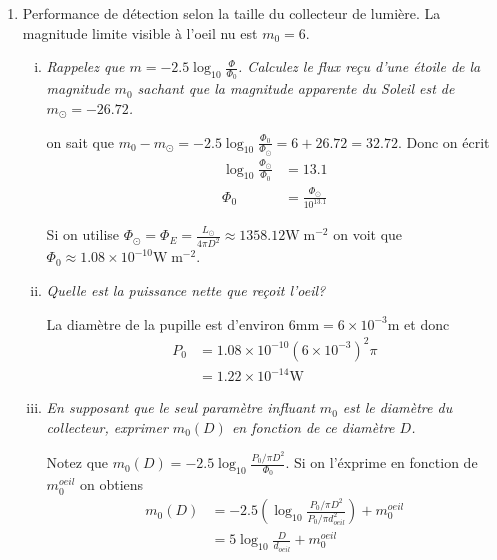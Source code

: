 \documentclass[10pt]{report}
\newcommand{\scinot}[2]{#1\times 10^{#2}}
\begin{document}
\begin{enumerate}[1)]
\begin{enumerate}[i)]
                Maintenant en assumant que la luminosit\'e de Sirius et la m\^eme que le Soleil, on peut mettre \'egal les deux expressions
                \begin{align}
                    \sigma T_{\odot}^4 \frac{R_{\odot}^2}{D_S^2}&= \pi R_{\odot}^2 \sigma T_{\odot}^4\frac{R_J^2}{ D_J^2}\frac{R_E^2}{4D_{EJ}^2}
                \end{align}

                Je n'ai pas fini cette \'exercise mais la r\'eponse est $83190 \mathrm{UA}$.
        \end{enumerate}
    \item Performance de d\'etection selon la taille du collecteur de lumi\`ere. La magnitude limite visible \`a l'oeil nu est $m_0 = 6$.
        \begin{enumerate}[i)]
            \item \emph{Rappelez que $m = -2.5 \log_{10} \frac{\Phi}{\Phi_0}$. Calculez le flux re\c{c}u d'une \'etoile de la magnitude $m_0$ sachant que la magnitude apparente du Soleil est de $m_{\odot} = -26.72$.}

                on sait que $m_0 - m_{\odot} = -2.5\log_{10}\frac{\Phi_0}{\Phi_{\odot}} = 6 + 26.72 = 32.72$. Donc on \'ecrit
                \begin{align}
                    \log_{10}\frac{\Phi_{\odot}}{\Phi_0} &= 13.1\\
                    \Phi_0 &= \frac{\Phi_{\odot}}{10^{13.1}}
                \end{align}
                
                Si on utilise $\Phi_{\odot} = \Phi_E = \frac{L_{\odot}}{4\pi D^2} \approx 1358.12 \mathrm{W\; m^{-2}}$ on voit que $\Phi_0 \approx \scinot{1.08}{-10}\mathrm{W\;m^{-2}}$.
            \item \emph{Quelle est la puissance nette que re\c{c}oit l'oeil?}

                La diam\`etre de la pupille est d'environ $6\mathrm{mm} = \scinot{6}{-3}\mathrm{m}$ et donc
                \begin{align}
                    P_0 &= \scinot{1.08}{-10} \left( \scinot{6}{-3} \right)^2 \pi\\
                    &= \scinot{1.22}{-14}\mathrm{W}
                \end{align}
            \item \emph{En supposant que le seul param\`etre influant $m_0$ est le diam\`etre du collecteur, exprimer $m_0(D)$ en fonction de ce diam\`etre $D$.}

                Notez que $m_0(D) = -2.5\log_{10}\frac{P_0/\pi D^2}{\Phi_0}$. Si on l'\'exprime en fonction de $m_0^{oeil}$ on obtiens
                \begin{align}
                    m_0(D) &= -2.5\left( \log_{10}\frac{P_0/\pi D^2}{P_0/\pi d_{oeil}^2}\right)  + m_0^{oeil}\\
                    &= 5\log_{10}\frac{D}{d_{oeil}} + m_0^{oeil}
                \end{align}
        \end{enumerate}
\end{enumerate}
\end{document}
